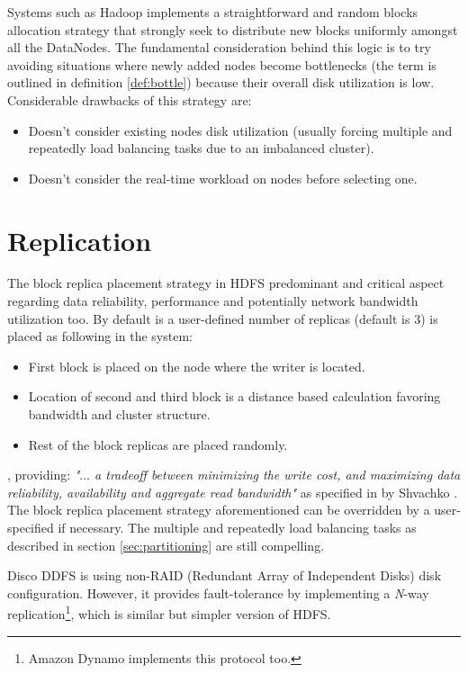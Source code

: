 Systems such as Hadoop implements a straightforward and random blocks allocation strategy that strongly seek to distribute new blocks uniformly amongst all the DataNodes. The fundamental consideration behind this logic is to try avoiding situations where newly added nodes become bottlenecks (the term is outlined in definition \ref{def:bottle}) because their overall disk utilization is low. Considerable drawbacks of this strategy are:

\begin{itemize}
	\item Doesn’t consider existing nodes disk utilization (usually forcing multiple and repeatedly load balancing tasks due to an imbalanced cluster).
	\item Doesn't consider the real-time workload on nodes before selecting one.
\end{itemize}

\section{Replication} \label{sec:replication}
The block replica placement strategy in HDFS predominant and critical aspect regarding data reliability, performance and potentially network bandwidth utilization too. By default is a user-defined number of replicas (default is 3) is placed as following in the system:

\begin{itemize}
	\item First block is placed on the node where the writer is located.
	\item Location of second and third block is a distance based calculation favoring bandwidth and cluster structure.
	\item Rest of the block replicas are placed randomly. 
\end{itemize}
\vspace*{3mm}

, providing: \textit{"$\ldots$ a tradeoff between minimizing the write cost, and maximizing data reliability, availability and aggregate read bandwidth"} as specified in \cite{Shvachko:2010:HDF:1913798.1914427} by Shvachko \etal. The block replica placement strategy aforementioned can be overridden by a user-specified if necessary. The multiple and repeatedly load balancing tasks as described in section \ref{sec:partitioning} are still compelling.
\newline

Disco DDFS is using non-RAID (Redundant Array of Independent Disks) disk configuration. However, it provides fault-tolerance by implementing a \textit{N}-way replication\footnote{Amazon Dynamo \cite{DeCandia:2007:DAH:1294261.1294281} implements this protocol too.}, which is similar but simpler version of HDFS.

